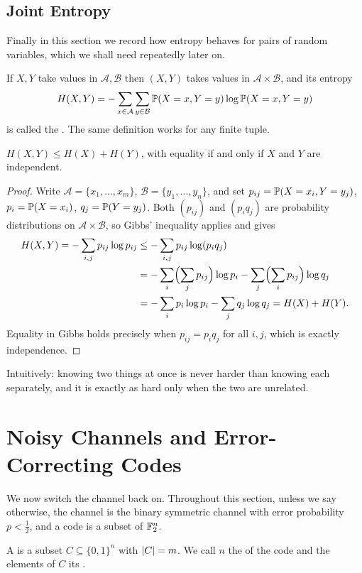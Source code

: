 \documentclass[a4paper]{scrartcl}
\newcommand{\Ac}{\mathcal{A}}
\newcommand{\Bc}{\mathcal{B}}
\begin{document}
\subsection{Joint Entropy}

Finally in this section we record how entropy behaves for pairs of random variables, which we shall need repeatedly later on.

If $X, Y$ take values in $\Ac, \Bc$ then $(X,Y)$ takes values in $\Ac \times \Bc$, and its entropy
$$H(X,Y) = -\sum_{x \in \Ac}\sum_{y \in \Bc} \PP(X = x, Y=y)\log \PP(X=x,Y=y)$$
is called the . The same definition works for any finite tuple.

\begin{lemma}[Subadditivity]\label{lem:subadd}
	$H(X,Y) \le H(X) + H(Y)$, with equality if and only if $X$ and $Y$ are independent.
\end{lemma}

\begin{proof}
	Write $\Ac = \{x_1, \dots, x_m\}$, $\Bc = \{y_1, \dots, y_n\}$, and set $p_{ij} = \mathbb{P}(X = x_i, Y = y_j)$, $p_i = \mathbb{P}(X = x_i)$, $q_j = \mathbb{P}(Y = y_j)$. Both $(p_{ij})$ and $(p_iq_j)$ are probability distributions on $\Ac \times \Bc$, so Gibbs' inequality applies and gives
	\begin{align*}
		H(X,Y) = -\sum_{i,j} p_{ij}\log p_{ij} &\le -\sum_{i,j}p_{ij}\log(p_iq_j) \\
		&= -\sum_i \Bigl(\sum_j p_{ij}\Bigr)\log p_i - \sum_j \Bigl(\sum_i p_{ij}\Bigr)\log q_j \\
		&= -\sum_i p_i \log p_i - \sum_j q_j \log q_j = H(X) + H(Y).
	\end{align*}
	Equality in Gibbs holds precisely when $p_{ij} = p_iq_j$ for all $i,j$, which is exactly independence.
\end{proof}

Intuitively: knowing two things at once is never harder than knowing each separately, and it is exactly as hard only when the two are unrelated.


\section{Noisy Channels and Error-Correcting Codes}

We now switch the channel back on. Throughout this section, unless we say otherwise, the channel is the binary symmetric channel with error probability $p < \tfrac12$, and a code is a subset of $\mathbb{F}_2^n$.

\begin{definition}
	A  is a subset $C \subseteq \{0,1\}^n$ with $\lvert C\rvert = m$. We call $n$ the  of the code and the elements of $C$ its .
\end{definition}
\end{document}
